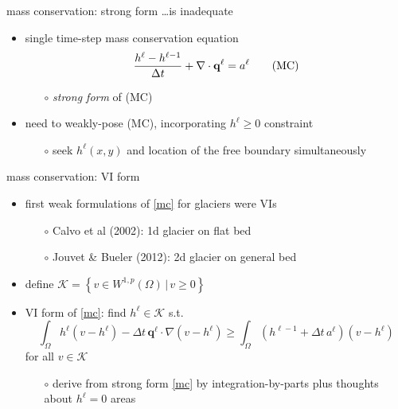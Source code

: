 \documentclass[xcolor={dvipsnames}]{beamer}
\newcommand\bq{\mathbf{q}}
\newcommand\grad{\nabla}
\begin{document}
\begin{frame}{mass conservation: strong form \dots is inadequate}

\begin{itemize}
\item single time-step mass conservation equation
\begin{equation}
\singletsmc \tag{MC} \label{mc}
\end{equation}
    \begin{itemize}
    \item[$\circ$] \emph{strong form} of (MC)
    \end{itemize}

\bigskip
\item \alert{need to weakly-pose (MC), incorporating $h^\ell\ge 0$ constraint}
    \begin{itemize}
    \item[$\circ$] seek $h^\ell(x,y)$ and location of the free boundary simultaneously
    \end{itemize}
\end{itemize}
\end{frame}


\begin{frame}{mass conservation: VI form}

\begin{itemize}
\item first weak formulations of \eqref{mc} for glaciers were VIs
    \begin{itemize}
    \item[$\circ$] Calvo et al (2002): 1d glacier on flat bed
    \item[$\circ$] Jouvet \& Bueler (2012): 2d glacier on general bed
    \end{itemize}
\item define $\mathcal{K} = \left\{v \in W^{1,p}(\Omega) \,\Big|\, v\ge 0\right\}$
\item VI form of \eqref{mc}: \quad find $h^\ell\in\mathcal{K}$ s.t.
    $$\int_\Omega h^\ell (v - h^\ell) - \Delta t\, \bq^\ell \cdot \grad(v - h^\ell) \ge \int_\Omega \left(h^{\ell-1} + \Delta t\, a^\ell\right) (v - h^\ell)$$
for all $v \in \mathcal{K}$
    \begin{itemize}
    \item[$\circ$] derive from strong form \eqref{mc} by integration-by-parts plus thoughts about $h^\ell=0$ areas
    \end{itemize}
\end{itemize}
\end{frame}
\end{document}
